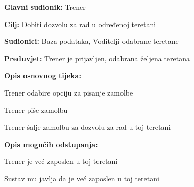 				\noindent {}
				\begin{packed_item}
					
					\item \textbf{Glavni sudionik: } Trener
					\item  \textbf{Cilj:} Dobiti dozvolu za rad u određenoj teretani
					\item  \textbf{Sudionici:} Baza podataka, Voditelji odabrane teretane
					\item  \textbf{Preduvjet:} Trener je prijavljen, odabrana željena teretana
					\item  \textbf{Opis osnovnog tijeka:}
					
					\item[] \begin{packed_enum}
						
						\item Trener odabire opciju za pisanje zamolbe
						\item Trener piše zamolbu
						\item Trener šalje zamolbu za dozvolu za rad u toj teretani
					\end{packed_enum}
					
					\item  \textbf{Opis mogućih odstupanja:}
					
					\item[] \begin{packed_item}
						
						\item[-] Trener je već zaposlen u toj teretani
						\item[] \begin{packed_enum}
							
							\item Sustav mu javlja da je već zaposlen u toj teretani
							
						\end{packed_enum}
						
					\end{packed_item}
				\end{packed_item}
				
